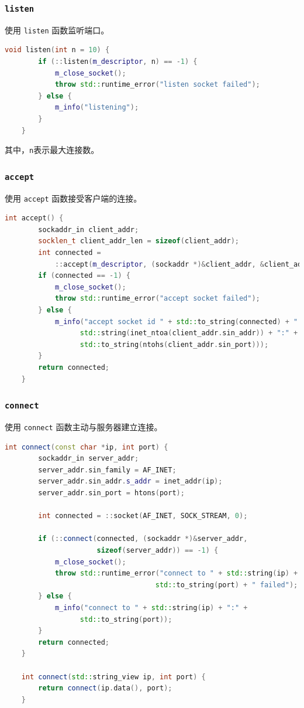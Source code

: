 \documentclass{article}
\begin{document}
\subsubsection{\texttt{listen}}

使用 \texttt{listen} 函数监听端口。

\begin{lstlisting}[language=C++, title=listen]
    void listen(int n = 10) {
        if (::listen(m_descriptor, n) == -1) {
            m_close_socket();
            throw std::runtime_error("listen socket failed");
        } else {
            m_info("listening");
        }
    }
\end{lstlisting}

其中，\texttt{n}表示最大连接数。

\subsubsection{\texttt{accept}}

使用 \texttt{accept} 函数接受客户端的连接。

\begin{lstlisting}[language=C++, title=accept]
    int accept() {
        sockaddr_in client_addr;
        socklen_t client_addr_len = sizeof(client_addr);
        int connected =
            ::accept(m_descriptor, (sockaddr *)&client_addr, &client_addr_len);
        if (connected == -1) {
            m_close_socket();
            throw std::runtime_error("accept socket failed");
        } else {
            m_info("accept socket id " + std::to_string(connected) + " from " +
                  std::string(inet_ntoa(client_addr.sin_addr)) + ":" +
                  std::to_string(ntohs(client_addr.sin_port)));
        }
        return connected;
    }
\end{lstlisting}

\subsubsection{\texttt{connect}}

使用 \texttt{connect} 函数主动与服务器建立连接。

\begin{lstlisting}[language=C++, title=connect]
    int connect(const char *ip, int port) {
        sockaddr_in server_addr;
        server_addr.sin_family = AF_INET;
        server_addr.sin_addr.s_addr = inet_addr(ip);
        server_addr.sin_port = htons(port);

        int connected = ::socket(AF_INET, SOCK_STREAM, 0);

        if (::connect(connected, (sockaddr *)&server_addr,
                      sizeof(server_addr)) == -1) {
            m_close_socket();
            throw std::runtime_error("connect to " + std::string(ip) + ":" +
                                    std::to_string(port) + " failed");
        } else {
            m_info("connect to " + std::string(ip) + ":" +
                  std::to_string(port));
        }
        return connected;
    }

    int connect(std::string_view ip, int port) {
        return connect(ip.data(), port);
    }
\end{lstlisting}
\end{document}
